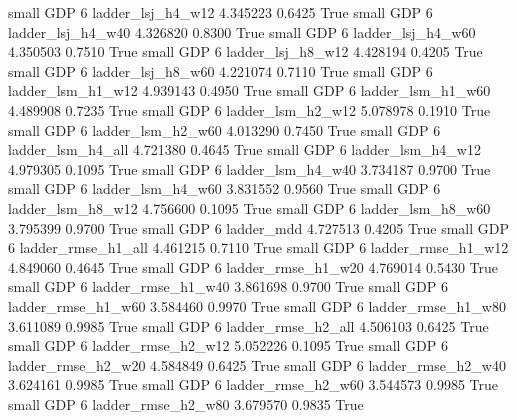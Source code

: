      small      GDP                 6        ladder_lsj_h4_w12   4.345223      0.6425    True
     small      GDP                 6        ladder_lsj_h4_w40   4.326820      0.8300    True
     small      GDP                 6        ladder_lsj_h4_w60   4.350503      0.7510    True
     small      GDP                 6        ladder_lsj_h8_w12   4.428194      0.4205    True
     small      GDP                 6        ladder_lsj_h8_w60   4.221074      0.7110    True
     small      GDP                 6        ladder_lsm_h1_w12   4.939143      0.4950    True
     small      GDP                 6        ladder_lsm_h1_w60   4.489908      0.7235    True
     small      GDP                 6        ladder_lsm_h2_w12   5.078978      0.1910    True
     small      GDP                 6        ladder_lsm_h2_w60   4.013290      0.7450    True
     small      GDP                 6        ladder_lsm_h4_all   4.721380      0.4645    True
     small      GDP                 6        ladder_lsm_h4_w12   4.979305      0.1095    True
     small      GDP                 6        ladder_lsm_h4_w40   3.734187      0.9700    True
     small      GDP                 6        ladder_lsm_h4_w60   3.831552      0.9560    True
     small      GDP                 6        ladder_lsm_h8_w12   4.756600      0.1095    True
     small      GDP                 6        ladder_lsm_h8_w60   3.795399      0.9700    True
     small      GDP                 6               ladder_mdd   4.727513      0.4205    True
     small      GDP                 6       ladder_rmse_h1_all   4.461215      0.7110    True
     small      GDP                 6       ladder_rmse_h1_w12   4.849060      0.4645    True
     small      GDP                 6       ladder_rmse_h1_w20   4.769014      0.5430    True
     small      GDP                 6       ladder_rmse_h1_w40   3.861698      0.9700    True
     small      GDP                 6       ladder_rmse_h1_w60   3.584460      0.9970    True
     small      GDP                 6       ladder_rmse_h1_w80   3.611089      0.9985    True
     small      GDP                 6       ladder_rmse_h2_all   4.506103      0.6425    True
     small      GDP                 6       ladder_rmse_h2_w12   5.052226      0.1095    True
     small      GDP                 6       ladder_rmse_h2_w20   4.584849      0.6425    True
     small      GDP                 6       ladder_rmse_h2_w40   3.624161      0.9985    True
     small      GDP                 6       ladder_rmse_h2_w60   3.544573      0.9985    True
     small      GDP                 6       ladder_rmse_h2_w80   3.679570      0.9835    True
